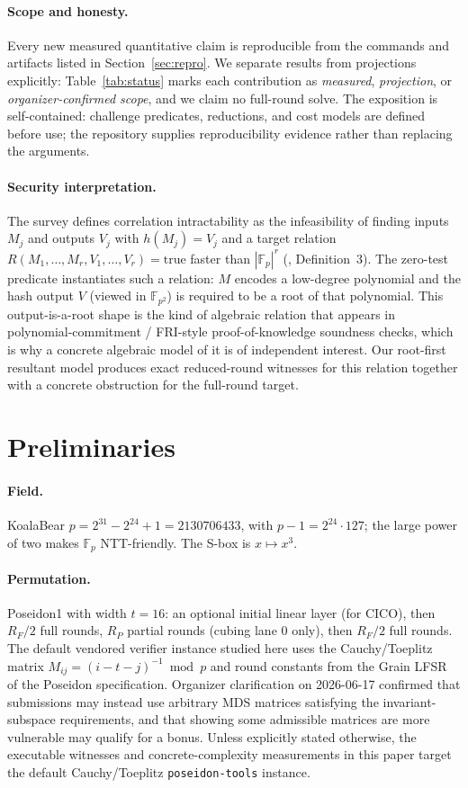 \documentclass[11pt]{article}
\newcommand{\Fp}{\mathbb{F}_p}
\newcommand{\Fpp}{\mathbb{F}_{p^2}}
\newcommand{\RF}{R_F}
\newcommand{\RP}{R_P}
\theoremstyle{plain}
\begin{document}
\paragraph{Scope and honesty.} Every new measured quantitative claim is
reproducible from the commands and artifacts listed in Section~\ref{sec:repro}.
We separate results from projections explicitly:
Table~\ref{tab:status} marks each contribution as \emph{measured},
\emph{projection}, or \emph{organizer-confirmed scope}, and we claim no
full-round solve. The exposition is self-contained: challenge predicates,
reductions, and cost models are defined before use; the repository supplies
reproducibility evidence rather than replacing the arguments.

\paragraph{Security interpretation.} The survey defines correlation
intractability as the infeasibility of finding inputs $M_j$ and outputs $V_j$
with $h(M_j)=V_j$ and a target relation
$R(M_1,\ldots,M_r,V_1,\ldots,V_r)=\mathrm{true}$ faster than $|\Fp|^r$
(\cite{survey2024}, Definition~3). The zero-test predicate instantiates such a
relation: $M$ encodes a low-degree polynomial and the hash output $V$ (viewed in
$\Fpp$) is required to be a root of that polynomial. This output-is-a-root shape
is the kind of algebraic relation that appears in polynomial-commitment /
FRI-style proof-of-knowledge soundness checks, which is why a concrete algebraic
model of it is of independent interest. Our root-first resultant model produces
exact reduced-round witnesses for this relation together with a concrete
obstruction for the full-round target.

\section{Preliminaries}\label{sec:prelim}
\paragraph{Field.} KoalaBear $p = 2^{31}-2^{24}+1 = 2130706433$, with
$p-1 = 2^{24}\cdot 127$; the large power of two makes $\Fp$ NTT-friendly. The S-box
is $x\mapsto x^3$.

\paragraph{Permutation.} Poseidon1 with width $t=16$: an optional initial linear
layer (for CICO), then $\RF/2$ full rounds, $\RP$ partial rounds (cubing lane $0$
only), then $\RF/2$ full rounds. The default vendored verifier instance studied
here uses the Cauchy/Toeplitz matrix $M_{ij} = (i-t-j)^{-1} \bmod p$ and round
constants from the Grain LFSR of the Poseidon specification. Organizer
clarification on 2026-06-17 confirmed that submissions may instead use arbitrary
MDS matrices satisfying the invariant-subspace requirements, and that showing
some admissible matrices are more vulnerable may qualify for a bonus. Unless
explicitly stated otherwise, the executable witnesses and concrete-complexity
measurements in this paper target the default Cauchy/Toeplitz
\texttt{poseidon-tools} instance.
\end{document}
